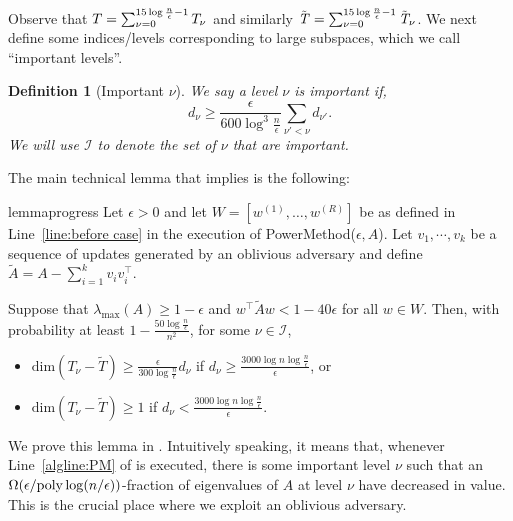 \documentclass[11pt]{article}
\newtheorem{definition}[theorem]{Definition}
\newcommand\poly{\mathrm{poly}}  \newcommand{\comp}[1]{\overline{#1}}
\def\dim#1{\mathrm{dim} (#1)}
\newcommand\vv{\boldsymbol{\mathit{v}}}
\newcommand\ww{\boldsymbol{\mathit{w}}}
\renewcommand\AA{\boldsymbol{\mathit{A}}}
\newcommand\WW{\boldsymbol{\mathit{W}}}
\newcommand\Ttil{{\tilde{\mathit{T}}}}
\newcommand\AAtil{\boldsymbol{\widetilde{\mathit{A}}}}
\begin{document}
Observe that $T = \sum_{\nu = 0}^{15\log\frac{n}{\epsilon}-1}T_\nu$ and similarly $\Ttil = \sum_{\nu = 0}^{15\log\frac{n}{\eps}-1}\Ttil_\nu$. We next define some indices/levels corresponding to large subspaces, which we call ``important levels''.
\begin{definition}[Important $\nu$]\label{def:impNu} We say a level $\nu$ is important if,
\[d_{\nu} \geq \frac{\epsilon}{600\log^3 \frac{n}{\epsilon}} \sum_{\nu'<\nu}d_{\nu'}.
\]
We will use $\mathcal{I}$ to denote the set of $\nu$ that are important.
\end{definition}


The main technical lemma that implies  is the following:


\begin{restatable}{lemma}{progress}\label{lem:EigenspaceChange}
	Let $\epsilon>0$ and let $\WW=[\ww^{(1)},\dots,\ww^{(R)}]$ be as defined in Line~\ref{line:before case} in the execution of {\sc PowerMethod}($\epsilon,\AA$). Let $\vv_{1},\cdots,\vv_{k}$ be a sequence of updates generated by an oblivious adversary and define $\AAtil=\AA-\sum_{i=1}^{k}\vv_{i}\vv_{i}^{\top}$.
	
	Suppose that $\lambda_{\max}(\AA)\ge 1-\epsilon$ and $\ww^{\top}\AAtil\ww<1-40\epsilon$ for all $\ww\in\WW$. Then, with probability at least $1-\frac{50\log\frac{n}{\epsilon}}{n^{2}}$, for some $\nu\in\mathcal{I}$,
	\begin{itemize}
		\item $\dim{T_{\nu}-\tilde{T}}\geq\frac{\epsilon}{300\log\frac{n}{\epsilon}}d_{\nu}$ if $d_{\nu}\geq\frac{3000\log n\log\frac{n}{\epsilon}}{\epsilon}$, or
		\item $\dim{T_{\nu}-\tilde{T}}\geq1$ if $d_{\nu}<\frac{3000\log n\log\frac{n}{\epsilon}}{\epsilon}$.
	\end{itemize}
\end{restatable}


We prove this lemma in . Intuitively speaking, it means that, whenever  Line~\ref{algline:PM} of  is executed, there is some important level $\nu$ such that an $\Omega(\eps/\poly \log(n/\eps))$-fraction of eigenvalues of $\AA$ at level $\nu$ have decreased in value. This is the crucial place where we exploit an oblivious adversary.
\end{document}
